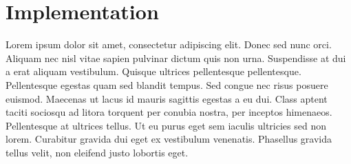 \chapter{Implementation}
\label{cha:implementation}
Lorem ipsum dolor sit amet, consectetur adipiscing elit. Donec sed nunc orci. Aliquam nec nisl vitae sapien pulvinar dictum quis non urna. Suspendisse at dui a erat aliquam vestibulum. Quisque ultrices pellentesque pellentesque. Pellentesque egestas quam sed blandit tempus. Sed congue nec risus posuere euismod. Maecenas ut lacus id mauris sagittis egestas a eu dui. Class aptent taciti sociosqu ad litora torquent per conubia nostra, per inceptos himenaeos. Pellentesque at ultrices tellus. Ut eu purus eget sem iaculis ultricies sed non lorem. Curabitur gravida dui eget ex vestibulum venenatis. Phasellus gravida tellus velit, non eleifend justo lobortis eget. 